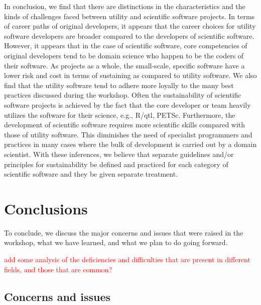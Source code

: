 \documentclass[11pt, oneside]{amsart}
\newcommand{\note}[1]{ {\textcolor{red}    { #1 }}}
\newcommand{\toolname}[1] {\textsf{#1}}
\begin{document}
In conclusion, we find that there are distinctions in the characteristics and
the kinds of challenges faced between utility and scientific software projects.
In terms of career paths of original developers, it appears that the career
choices for utility software developers are broader compared to the developers
of scientific software. However, it appears that in the case of scientific
software, core competencies of original developers tend to be domain science
who happen to be the coders of their software. As projects as a whole, the
small-scale, specific software have a lower risk and cost in terms of
sustaining as compared to utility software. We also find that the utility
software tend to adhere more loyally to the many best practices discussed
during the workshop. Often the sustainability of scientific software projects
is achieved by the fact that the core developer or team heavily utilizes the
software for their science, e.g.,  \toolname{R/qtl, PETSc}.  Furthermore, the
development of scientific software requires more scientific skills compared
with those of utility software. This diminishes the need of specialist
programmers and practices in many cases where the bulk of development is
carried out by a domain scientist. With these inferences, we believe that
separate guidelines and/or principles for sustainability be defined and
practiced for each category of scientific software and they be given separate
treatment.



\section{Conclusions} \label{sec:conclusions}

To conclude, we discuss the major concerns and issues that were raised in
the workshop, what we have learned, and what we plan to do going forward.

\note{add some analysis of the deficiencies and difficulties that are
  present in different fields, and those that are common?}

\subsection{Concerns and issues}
\end{document}
